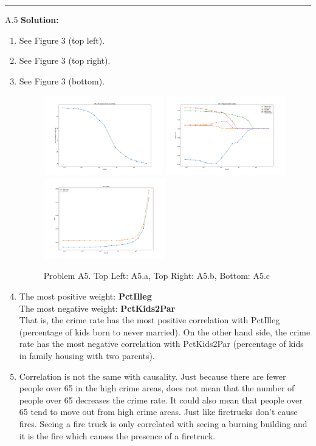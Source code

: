 \documentclass{article}
\newcommand{\1}{\mathbf{1}}
\begin{document}
\noindent\rule{\textwidth}{1pt}
A.5 {\bf Solution:}\\
\begin{enumerate}
    \item See Figure 3 (top left). 
    \item See Figure 3 (top right). 
    \item See Figure 3 (bottom).
        \begin{figure}[h!]
            \centering
            \includegraphics[width=0.49\textwidth]{hw2/code/figures/A5a.pdf}
            \includegraphics[width=0.49\textwidth]{hw2/code/figures/A5b.pdf}
            \includegraphics[width=0.5\textwidth]{hw2/code/figures/A5c.pdf}
            \caption{Problem A5. Top Left: A5.a, Top Right: A5.b, Bottom: A5.c}
            \label{figure:a4}
        \end{figure}
    \item The most positive weight: {\bf PctIlleg}\\
          The most negative weight: {\bf PctKids2Par}\\
          That is, the crime rate has the most positive correlation with PctIlleg (percentage of kids born to never married). On the other hand side, the crime rate has the most negative correlation with PctKids2Par (percentage of kids in family housing with two parents).
    \item Correlation is not the same with causality. Just because there are fewer people over 65 in the high crime areas, does not mean that the number of people over 65 decreases the crime rate. It could also mean that people over 65 tend to move out from high crime areas. Just like firetrucks don't cause fires. Seeing a fire truck is only correlated with seeing a burning building and it is the fire which causes the presence of a firetruck.

\end{enumerate}
\end{document}
